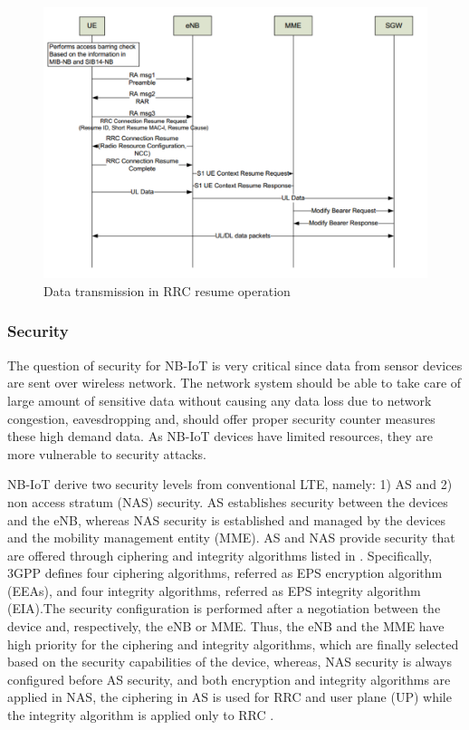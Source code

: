 \documentclass[12pt]{article}
\begin{document}
\begin{figure}[h]
    \centering
    \includegraphics[width=0.8\columnwidth]{Images/dataRRCresume.pdf}
    \caption{Data transmission in RRC resume operation \cite{ratasuk2016overview}}
    \label{fig:Sequence diagram of RRC resume cycle}
\end{figure}
 


\subsubsection{Security}

The question of security for NB-IoT is very critical since data from sensor devices are sent over wireless network. The network system should be able to take care of large amount of sensitive data without causing any data loss due to network congestion, eavesdropping and, should offer proper security counter measures these high demand data. As NB-IoT devices have limited resources, they are more vulnerable to security attacks.\par

NB-IoT derive two security levels from conventional LTE,
namely: 1) AS and 2) non access stratum (NAS) security. AS establishes security between the devices and the eNB, whereas NAS security is established and managed by the devices and the mobility management entity (MME). AS and NAS provide security that are offered through ciphering and integrity algorithms listed in \cite{3GPPsecurity}. Specifically, 3GPP defines four ciphering algorithms, referred as EPS encryption algorithm (EEAs), and four integrity algorithms, referred as EPS integrity algorithm (EIA).The security configuration is performed after a negotiation between the device and, respectively, the eNB or MME. Thus, the eNB and the MME have high priority for the ciphering and integrity algorithms, which are finally selected based on the security capabilities of the device, whereas, NAS security is always configured before AS security, and both encryption and integrity algorithms are applied in NAS, the ciphering in AS is used for RRC and user plane (UP) while the integrity algorithm is applied only to RRC \cite{martinez2019exploring}.
\end{document}
